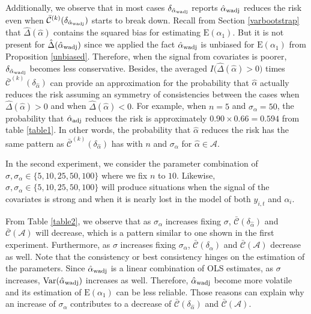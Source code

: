 \documentclass[11pt]{article}
\def\mc#1{\mathcal{#1}} %
\def\E#1{\mathrm{E}(#1)} %
\def\var#1{\mathrm{Var}(#1)} %
\theoremstyle{definition}
\begin{document}
Additionally, we  observe that in most cases $\delta_{\hat{\alpha}_{\rm wadj}}$ reports $\hat{\alpha}_{\rm wadj}$ reduces the risk even when $\bar{\mc{C}}^{(k)}(\delta_{\hat{\alpha}_{\rm wadj}})$ starts to break down.  Recall from Section \ref{varbootstrap} that $\hat{\Delta}(\hat{\alpha})$ contains the squared bias for estimating $\E{\alpha_1}$. But it is not present for $\hat{\Delta}(\hat{\alpha}_{\rm wadj})$ since we applied the fact  $\hat{\alpha}_{\rm wadj}$ is unbiased for $\E{\alpha_1}$ from Proposition \ref{unbiased}. Therefore, when the signal from covariates is poorer, $\delta_{\hat{\alpha}_{\rm wadj}}$ becomes less conservative. Besides, the averaged $I\big(\hat{\Delta}(\hat{\alpha})>0\big)$ times $\bar{\mc{C}}^{(k)}(\delta_{\hat{\alpha}})$ can provide an approximation for the probability that $\hat{\alpha}$ actually reduces the risk assuming an symmetry of consistencies between the cases when $\hat{\Delta}(\hat{\alpha})>0$ and when $\hat{\Delta}(\hat{\alpha})<0$. For example, when $n = 5$ and $\sigma_{\alpha}=50$, the probability that $\hat{\alpha}_{\rm adj}$ reduces the risk is approximately $0.90 \times 0.66 = 0.594$ from table \ref{table1}.  In other words,  the probability that $\hat{\alpha}$ reduces the risk has the same pattern as $\bar{\mc{C}}^{(k)}(\delta_{\hat{\alpha}})$ has with $n$ and $\sigma_{\alpha}$ for $\hat{\alpha}\in \mc{A}$.




In the second experiment, we consider the parameter combination of $\sigma, \sigma_{\alpha} \in  \{5, 10, 25, 50, 100\}$ where we fix $n$ to $10$. Likewise, $\sigma, \sigma_{\alpha} \in  \{5, 10, 25, 50, 100\}$ will produce situations when the signal of the covariates is strong and when it is nearly lost in the model of  both $y_{i,t}$ and $\alpha_i$.



From Table \ref{table2}, we observe that as $\sigma_{\alpha}$ increases fixing $\sigma$, $\bar{\mc{C}}(\delta_{\hat{\alpha}})$ and $\bar{\mc{C}}(\mc{A})$ will  decrease, which is a pattern similar to one shown in the first experiment. Furthermore, as $\sigma$ increases fixing $\sigma_{\alpha}$, $\bar{\mc{C}}(\delta_{\hat{\alpha}})$ and $\bar{\mc{C}}(\mc{A})$ decrease as well. Note that the consistency or best consistency  hinges on the estimation of the parameters. Since $\hat{\alpha}_{\rm wadj}$  is a linear combination of OLS estimates, as $\sigma$ increases, $\var{\hat{\alpha}_{\rm wadj}}$ increases as well. Therefore, $\hat{\alpha}_{\rm wadj}$ become more volatile and its estimation of $\E{\alpha_1}$ can be less reliable. Those reasons can explain  why an increase of $\sigma_{\alpha}$ contributes to a decrease of  $\bar{\mc{C}}(\delta_{\hat{\alpha}})$ and $\bar{\mc{C}}(\mc{A})$.
\end{document}

